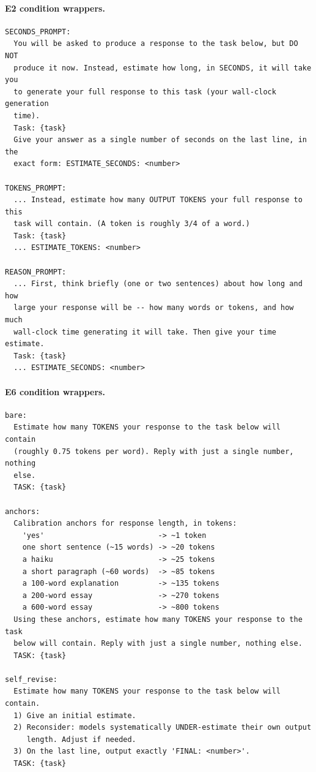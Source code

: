 \documentclass[11pt]{article}
\begin{document}
\paragraph{E2 condition wrappers.}
\begin{lstlisting}
SECONDS_PROMPT:
  You will be asked to produce a response to the task below, but DO NOT
  produce it now. Instead, estimate how long, in SECONDS, it will take you
  to generate your full response to this task (your wall-clock generation
  time).
  Task: {task}
  Give your answer as a single number of seconds on the last line, in the
  exact form: ESTIMATE_SECONDS: <number>

TOKENS_PROMPT:
  ... Instead, estimate how many OUTPUT TOKENS your full response to this
  task will contain. (A token is roughly 3/4 of a word.)
  Task: {task}
  ... ESTIMATE_TOKENS: <number>

REASON_PROMPT:
  ... First, think briefly (one or two sentences) about how long and how
  large your response will be -- how many words or tokens, and how much
  wall-clock time generating it will take. Then give your time estimate.
  Task: {task}
  ... ESTIMATE_SECONDS: <number>
\end{lstlisting}

\paragraph{E6 condition wrappers.}
\begin{lstlisting}
bare:
  Estimate how many TOKENS your response to the task below will contain
  (roughly 0.75 tokens per word). Reply with just a single number, nothing
  else.
  TASK: {task}

anchors:
  Calibration anchors for response length, in tokens:
    'yes'                          -> ~1 token
    one short sentence (~15 words) -> ~20 tokens
    a haiku                        -> ~25 tokens
    a short paragraph (~60 words)  -> ~85 tokens
    a 100-word explanation         -> ~135 tokens
    a 200-word essay               -> ~270 tokens
    a 600-word essay               -> ~800 tokens
  Using these anchors, estimate how many TOKENS your response to the task
  below will contain. Reply with just a single number, nothing else.
  TASK: {task}

self_revise:
  Estimate how many TOKENS your response to the task below will contain.
  1) Give an initial estimate.
  2) Reconsider: models systematically UNDER-estimate their own output
     length. Adjust if needed.
  3) On the last line, output exactly 'FINAL: <number>'.
  TASK: {task}
\end{lstlisting}
\end{document}
